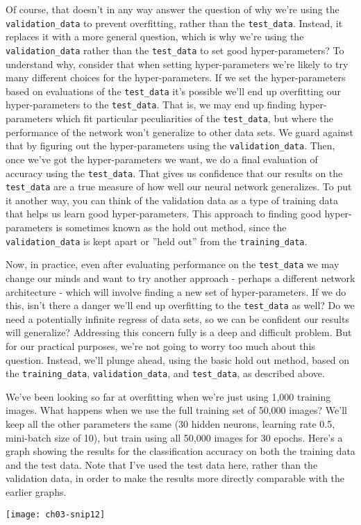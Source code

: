 Of course, that doesn't in any way answer the question of why we're using the \lstinline{validation_data} to prevent overfitting, rather than the \lstinline{test_data}. Instead, it replaces it with a more general question, which is why we're using the  \lstinline{validation_data} rather than the \lstinline{test_data} to set good hyper-parameters? To understand why, consider that when setting hyper-parameters we're likely to try many different choices for the hyper-parameters. If we set the hyper-parameters based on evaluations of the \lstinline{test_data} it's possible we'll end up overfitting our hyper-parameters to the \lstinline{test_data}. That is, we may end up finding hyper-parameters which fit particular peculiarities of the \lstinline{test_data}, but where the performance of the network won't generalize to other data sets. We guard against that by figuring out the hyper-parameters using the \lstinline{validation_data}. Then, once we've got the hyper-parameters we want, we do a final evaluation of accuracy using the \lstinline{test_data}. That gives us confidence that our results on the \lstinline{test_data} are a true measure of how well our neural network generalizes. To put it another way, you can think of the validation data as a type of training data that helps us learn good hyper-parameters. This approach to finding good hyper-parameters is sometimes known as the hold out method, since the  \lstinline{validation_data} is kept apart or ''held out'' from the \lstinline{training_data}.


Now, in practice, even after evaluating performance on the \lstinline{test_data} we may change our minds and want to try another approach - perhaps a different network architecture - which will involve finding a new set of hyper-parameters. If we do this, isn't there a danger we'll end up overfitting to the \lstinline{test_data} as well? Do we need a potentially infinite regress of data sets, so we can be confident our results will generalize? Addressing this concern fully is a deep and difficult problem. But for our practical purposes, we're not going to worry too much about this question. Instead, we'll plunge ahead, using the basic hold out method, based on the \lstinline{training_data}, \lstinline{validation_data}, and \lstinline{test_data}, as described above.

We've been looking so far at overfitting when we're just using 1,000 training images. What happens when we use the full training set of 50,000 images? We'll keep all the other parameters the same (30 hidden neurons, learning rate 0.5, mini-batch size of 10), but train using all 50,000 images for 30 epochs. Here's a graph showing the results for the classification accuracy on both the training data and the test data. Note that I've used the test data here, rather than the validation data, in order to make the results more directly comparable with the earlier graphs.
\begin{marginfigure}
\texttt{[image: ch03-snip12]}
\end{marginfigure}

